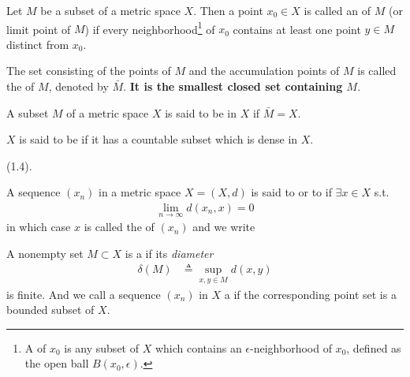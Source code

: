 \documentclass[11pt]{article}
\begin{document}
\begin{definition}
	Let $M$ be a subset of a metric space $X$. Then a point $x_0 \in X$ is called an  of $M$ (or limit point of $M$) if every neighborhood\footnote{A  of $x_0$ is any subset of $X$ which contains an $\epsilon$-neighborhood of $x_0$, defined as the open ball $B(x_0, \epsilon)$.} of $x_0$ contains at least one point $y \in M$ distinct from $x_0$. 
	
	The set consisting of the points of $M$ and the accumulation points of $M$ is called the  of $M$, denoted by $\bar M$. \textbf{It is the smallest closed set containing $M$}. 
	
	A subset $M$ of a metric space $X$ is said to be  in $X$ if $\bar M = X$. 
	
	$X$ is said to be  if it has a countable subset which is dense in $X$. 
\end{definition}


 (1.4). 

\begin{definition}
	A sequence $(x_n)$ in a metric space $X = (X, d)$ is said to  or to  if $\exists x \in X$ s.t. 
	\begin{align}
		\lim_{n \to \infty} d(x_n, x) = 0
	\end{align}
	in which case $x$ is called the  of $(x_n)$ and we write 
\end{definition}

\begin{definition}
	A nonempty set $M \subset X$ is a  if its \textit{diameter} 
	\begin{align}
		\delta(M) &\triangleq \sup_{x, y \in M} d(x, y)
	\end{align}
	is finite. And we call a sequence $(x_n)$ in $X$ a  if the corresponding point set is a bounded subset of $X$. 
\end{definition}
\end{document}
